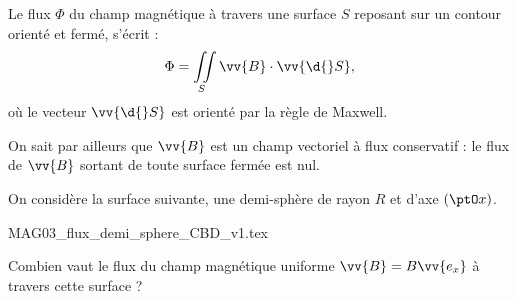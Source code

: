 \newpage




\medskip

Le flux $\Phi$ du champ magnétique à travers une surface $S$ reposant sur un contour orienté et fermé, s'écrit : 
\[
\Phi = \iint\limits_S \vv{B}\cdot \vv{\d{} S},
\]
où le vecteur $\vv{\d{} S}$ est orienté par la règle de Maxwell. 

On sait par ailleurs que $\vv{B}$ est un champ vectoriel à flux conservatif : le flux de $\vv{B}$ sortant de toute surface fermée est nul. 





\hauteurLargeurCadreReponse		{8mm}{2cm}
\initialisationEntrainement

\debutEntrainement

On considère la surface suivante, une demi-sphère de rayon $R$  et d'axe $(\ptO x)$.

\begin{center}
{MAG03_flux_demi_sphere_CBD_v1.tex}
\end{center}

Combien vaut le flux du champ magnétique uniforme $\vv{B}=B \vv{e_x}$ à travers cette surface ?


\smallskip

